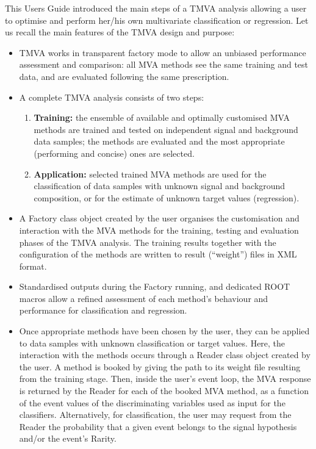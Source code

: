 This Users Guide introduced the main steps of a TMVA analysis allowing a user to optimise 
and perform her/his own multivariate classification or regression. Let us recall the main 
features of the TMVA design and purpose:
\begin{itemize}

\item TMVA works in transparent factory mode to allow an unbiased 
      performance assessment and comparison: all MVA methods
      see the same training and test data, and are evaluated following 
      the same prescription. 

\item A complete TMVA analysis consists of two steps:
      \begin{enumerate}

      \item {\bf Training:}
            the ensemble of available and optimally customised MVA methods are 
            trained and tested on independent signal and background data samples; the 
            methods are evaluated and the most appropriate (performing and concise) 
            ones are selected.

      \item {\bf Application:}
            selected trained MVA methods are used for the classification of data samples with
            unknown signal and background composition, or for the estimate of unknown 
            target values (regression).  

      \end{enumerate}
      
\item A Factory class object created by the user organises the 
      customisation and interaction with the MVA methods for the training, 
      testing and evaluation phases of the TMVA analysis. The training results 
      together with the configuration of the methods are written to
      result (``weight'') files in XML format.

\item Standardised outputs during the Factory running, and dedicated ROOT 
      macros allow a refined assessment of each method's behaviour and 
      performance for classification and regression.
     
\item Once appropriate methods have been chosen by the user, they can be 
      applied to data samples with unknown classification or target values. Here, 
      the interaction with the methods occurs through a Reader class 
      object created by the user. A method is booked by giving the path to its
      weight file resulting from the training stage. Then, inside
      the user's event loop, the MVA response is returned by the Reader for 
      each of the booked MVA method, as a function of the event values of the 
      discriminating variables used as input for the classifiers. Alternatively,
      for classification, the user may request from the Reader the probability 
      that a given event belongs to the signal hypothesis and/or the event's Rarity.


\end{itemize}
